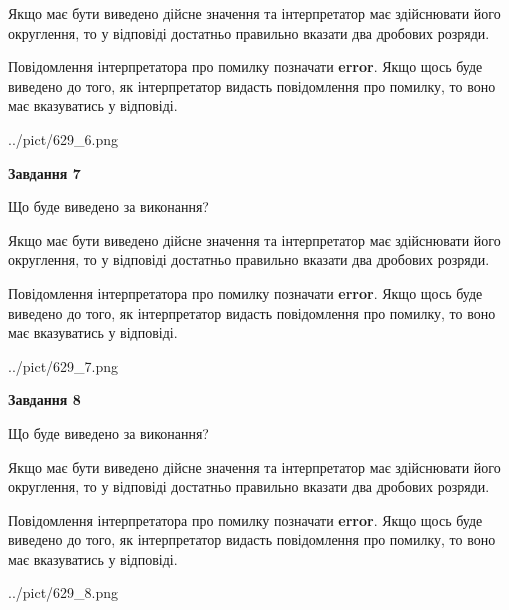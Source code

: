 \documentclass[12pt, ukrainian]{article}
\begin{document}
{\begin {Large}
Якщо має бути виведено дійсне значення та інтерпретатор має здійснювати його округлення, 
то у відповіді достатньо правильно вказати два дробових розряди.

Повідомлення інтерпретатора про помилку позначати \textbf{error}.
Якщо щось буде виведено до того, як інтерпретатор видасть повідомлення про помилку, 
то воно має вказуватись у відповіді. \par

\begin{center}
	{../pict/629_6.png}
\end{center}
\newpage

{\begin {center}\textbf{Завдання 7}\end {center}}\par
Що буде виведено за виконання? \par

Якщо має бути виведено дійсне значення та інтерпретатор має здійснювати його округлення, 
то у відповіді достатньо правильно вказати два дробових розряди.

Повідомлення інтерпретатора про помилку позначати \textbf{error}.
Якщо щось буде виведено до того, як інтерпретатор видасть повідомлення про помилку, 
то воно має вказуватись у відповіді. \par

\begin{center}
	{../pict/629_7.png}
\end{center}
\newpage

{\begin {center}\textbf{Завдання 8}\end {center}}\par
Що буде виведено за виконання? \par

Якщо має бути виведено дійсне значення та інтерпретатор має здійснювати його округлення, 
то у відповіді достатньо правильно вказати два дробових розряди.

Повідомлення інтерпретатора про помилку позначати \textbf{error}.
Якщо щось буде виведено до того, як інтерпретатор видасть повідомлення про помилку, 
то воно має вказуватись у відповіді. \par

\begin{center}
	{../pict/629_8.png}
\end{center}
\newpage


\end{Large}}
\end{document}
